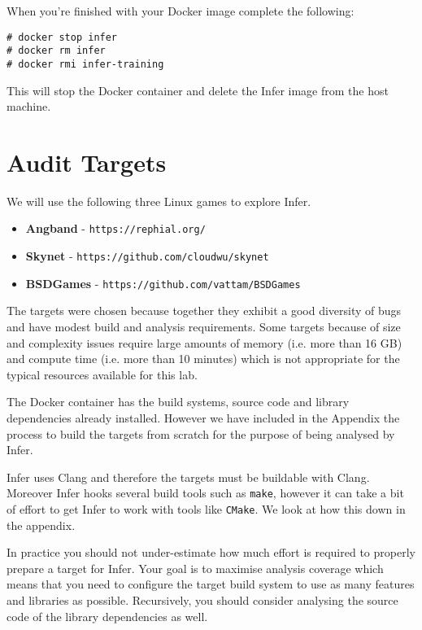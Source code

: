 When you're finished with your Docker image complete the following:

\begin{verbatim}
# docker stop infer
# docker rm infer
# docker rmi infer-training
\end{verbatim}

This will stop the Docker container and delete the Infer image from the host machine.

\section{Audit Targets}

We will use the following three Linux games to explore Infer.

\begin{itemize}
	\itemsep0em 
	\item \textbf{Angband} - \verb|https://rephial.org/|
	\item \textbf{Skynet} - \verb|https://github.com/cloudwu/skynet|
	\item \textbf{BSDGames} - \verb|https://github.com/vattam/BSDGames|
\end{itemize}

The targets were chosen because together they exhibit a good diversity of bugs
and have modest build and analysis requirements. 
Some targets because of size and complexity issues require large amounts of 
memory (i.e. more than 16 GB) and compute time (i.e. more than 10 minutes) which is not appropriate
for the typical resources available for this lab.

The Docker container has the build systems, source code and library dependencies
already installed. 
However we have included in the Appendix the process to build the targets 
from scratch for the purpose of being analysed by Infer.

Infer uses Clang and therefore the targets must be buildable with Clang.
Moreover Infer hooks several build tools such as \verb|make|, however
it can take a bit of effort to get Infer to work with tools like \verb|CMake|.
We look at how this down in the appendix.

In practice you should not under-estimate how much effort is required to 
properly prepare a target for Infer. Your goal is to maximise analysis
coverage which means that you need to configure the target build system 
to use as many features and libraries as possible. 
Recursively, you should consider analysing the source code of the library dependencies
as well.

